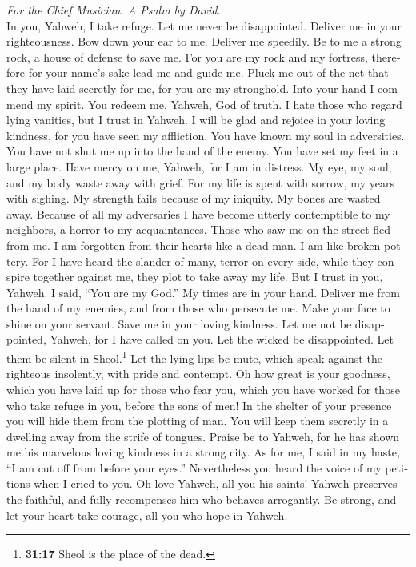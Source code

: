 \begin{paracol}{2}
\begin{otherlanguage}{english}
\emph{For the Chief Musician. A Psalm by David.}\\
 In you, Yahweh, I take refuge. Let me never be
disappointed. Deliver me in your righteousness.  Bow down
your ear to me. Deliver me speedily. Be to me a strong rock, a house of
defense to save me.  For you are my rock and my fortress,
therefore for your name's sake lead me and guide me. 
Pluck me out of the net that they have laid secretly for me, for you are
my stronghold.  Into your hand I commend my spirit. You
redeem me, Yahweh, God of truth.  I hate those who regard
lying vanities, but I trust in Yahweh.  I will be glad and
rejoice in your loving kindness, for you have seen my affliction. You
have known my soul in adversities.  You have not shut me
up into the hand of the enemy. You have set my feet in a large place.
 Have mercy on me, Yahweh, for I am in distress. My eye,
my soul, and my body waste away with grief.  For my life
is spent with sorrow, my years with sighing. My strength fails because
of my iniquity. My bones are wasted away.  Because of all
my adversaries I have become utterly contemptible to my neighbors, a
horror to my acquaintances. Those who saw me on the street fled from me.
 I am forgotten from their hearts like a dead man. I am
like broken pottery.  For I have heard the slander of
many, terror on every side, while they conspire together against me,
they plot to take away my life.  But I trust in you,
Yahweh. I said, ``You are my God.''  My times are in your
hand. Deliver me from the hand of my enemies, and from those who
persecute me.  Make your face to shine on your servant.
Save me in your loving kindness.  Let me not be
disappointed, Yahweh, for I have called on you. Let the wicked be
disappointed. Let them be silent in Sheol.\footnote{\textbf{31:17} Sheol
  is the place of the dead.}  Let the lying lips be mute,
which speak against the righteous insolently, with pride and contempt.
 Oh how great is your goodness, which you have laid up
for those who fear you, which you have worked for those who take refuge
in you, before the sons of men!  In the shelter of your
presence you will hide them from the plotting of man. You will keep them
secretly in a dwelling away from the strife of tongues. 
Praise be to Yahweh, for he has shown me his marvelous loving kindness
in a strong city.  As for me, I said in my haste, ``I am
cut off from before your eyes.'' Nevertheless you heard the voice of my
petitions when I cried to you.  Oh love Yahweh, all you
his saints! Yahweh preserves the faithful, and fully recompenses him who
behaves arrogantly.  Be strong, and let your heart take
courage, all you who hope in Yahweh.


\end{otherlanguage}
\end{paracol}
